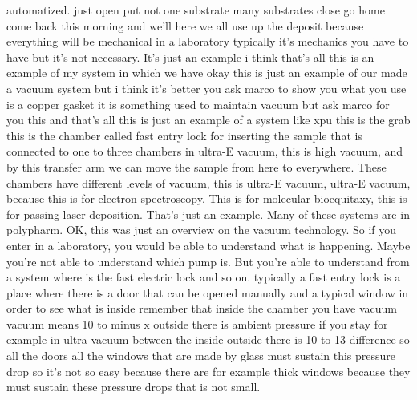 automatized. just open put not one substrate many substrates close go home come back this morning and we'll here we all use up the deposit because everything will be mechanical in a laboratory typically it's mechanics you have to have but it's not necessary.
It's just an example i think that's all this is an example of my system in which we have okay this is just an example of our made a vacuum system but i think it's better you ask marco to show you what you use is a copper gasket it is something used to maintain vacuum but ask marco for you this and that's all this is just an example of a system like xpu this is the grab this is the chamber called fast entry lock for inserting the sample that is connected to one to three chambers in ultra-E vacuum, this is high vacuum, and by this transfer arm we can move the sample from here to everywhere. These chambers have different levels of vacuum, this is ultra-E vacuum, ultra-E vacuum, because this is for electron spectroscopy. This is for molecular bioequitaxy, this is for passing laser deposition. That's just an example. Many of these systems are in polypharm. OK, this was just an overview on the vacuum technology. So if you enter in a laboratory, you would be able to understand what is happening. Maybe you're not able to understand which pump is. But you're able to understand from a system where is the fast electric lock and so on. typically a fast entry lock is a place where there is a door that can be opened manually and a typical window in order to see what is inside remember that inside the chamber you have vacuum vacuum means 10 to minus x outside there is ambient pressure if you stay for example in ultra vacuum between the inside outside there is 10 to 13 difference so all the doors all the windows that are made by glass must sustain this pressure drop so it's not so easy because there are for example thick windows because they must sustain these pressure drops that is not small.